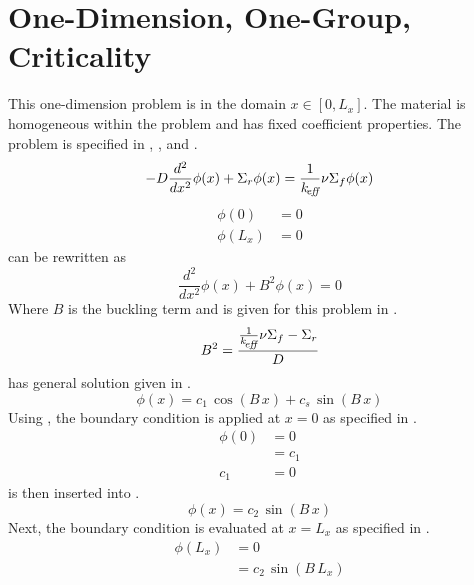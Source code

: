 \section{One-Dimension, One-Group, Criticality} 
  \label{sec:deriv_1d1g}
  This one-dimension problem is in the domain $x \in [0,L_x]$. The material
  is homogeneous within the problem and has fixed coefficient properties. The
  problem is specified in , , and
  .
  \begin{equation}
    \label{eq:1d1g}
    -D \frac{d^2}{dx^2} \phi(x) + \Sigma_r \phi(x) = 
      \frac{1}{k_{\!\mbox{\scriptsize \em eff}}} \nu \Sigma_f \phi(x)
  \end{equation}
  \begin{align}
    \label{eq:1d1g_bc1}
    \phi(0) &= 0 \\
    \label{eq:1d1g_bc2}
    \phi(L_x) &= 0
  \end{align}
   can be rewritten as
  \begin{equation}
    \label{eq:1d1g_buckle}
    \frac{d^2}{dx^2} \phi(x) + B^2 \phi(x) = 0
  \end{equation}
  Where $B$ is the buckling term and is given for this problem in
  .
  \begin{equation}
    \label{eq:1d1g_b2}
    B^2 = \frac{\frac{1}{k_{\!\mbox{\scriptsize \em eff}}} \nu \Sigma_f - \Sigma_r}{D}
  \end{equation}
   has general solution given in .
  \begin{equation}
    \label{eq:1d1g_general}
    \phi(x) = c_1 \, \cos(B \, x) + c_s \, \sin(B \, x)
  \end{equation}
  Using , the boundary condition is applied at $x=0$ as
  specified in .
  \begin{align}
    \phi(0) &= 0 \\
    &= c_1 \\
    \label{eq:1d1g_c1}
    c_1 &= 0
  \end{align}
   is then inserted into .
  \begin{equation}
    \label{eq:1d1g_sin}
    \phi(x) = c_2 \, \sin(B \, x)
  \end{equation}
  Next, the boundary condition is evaluated at $x=L_x$ as specified in
  .
  \begin{align}
    \phi(L_x) &= 0 \\
    &= c_2 \, \sin(B \, L_x)
  \end{align}
